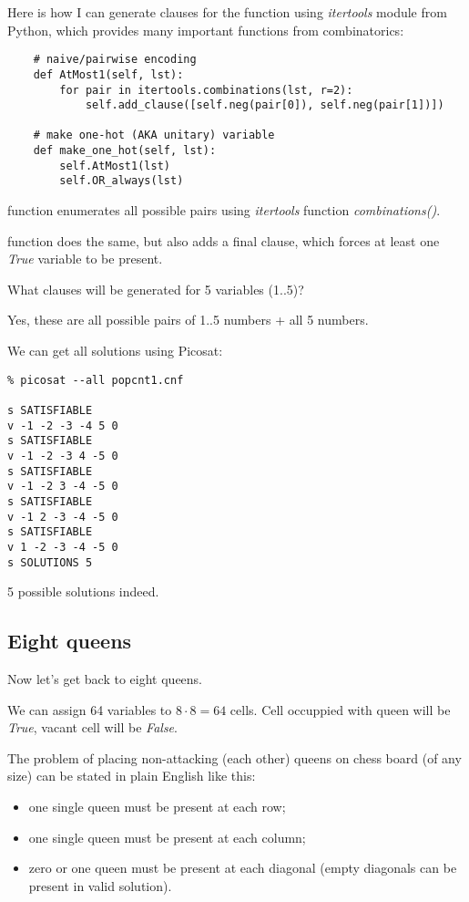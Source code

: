Here is how I can generate clauses for the function using \emph{itertools} module from Python,
which provides many important functions from combinatorics:

\begin{lstlisting}
    # naive/pairwise encoding   
    def AtMost1(self, lst):
        for pair in itertools.combinations(lst, r=2):
            self.add_clause([self.neg(pair[0]), self.neg(pair[1])])
       
    # make one-hot (AKA unitary) variable
    def make_one_hot(self, lst):
        self.AtMost1(lst)
        self.OR_always(lst)
\end{lstlisting}

 function enumerates all possible pairs using \emph{itertools} function
\emph{combinations()}.

 function does the same, but also adds a final clause, which forces at least one
\emph{True} variable to be present.

What clauses will be generated for 5 variables (1..5)?



Yes, these are all possible pairs of 1..5 numbers + all 5 numbers.

We can get all solutions using Picosat:

\begin{lstlisting}
% picosat --all popcnt1.cnf

s SATISFIABLE
v -1 -2 -3 -4 5 0
s SATISFIABLE
v -1 -2 -3 4 -5 0
s SATISFIABLE
v -1 -2 3 -4 -5 0
s SATISFIABLE
v -1 2 -3 -4 -5 0
s SATISFIABLE
v 1 -2 -3 -4 -5 0
s SOLUTIONS 5
\end{lstlisting}

5 possible solutions indeed.

\subsection{Eight queens}

Now let's get back to eight queens.

We can assign 64 variables to $8 \cdot 8=64$ cells.
Cell occuppied with queen will be \emph{True}, vacant cell will be \emph{False}.

The problem of placing non-attacking (each other) queens on chess board (of any size) can be stated in plain English like this:
\begin{itemize}
\item one single queen must be present at each row;

\item one single queen must be present at each column;

\item zero or one queen must be present at each diagonal (empty diagonals can be present in valid solution).
\end{itemize}

